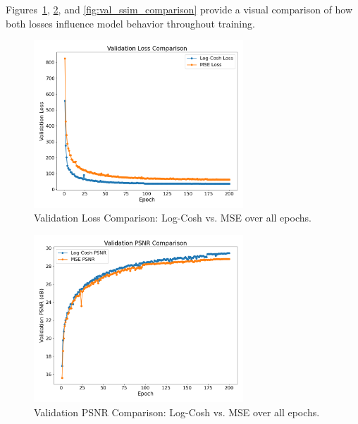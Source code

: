 Figures~\ref{fig:val_loss_comparison}, \ref{fig:val_psnr_comparison}, and \ref{fig:val_ssim_comparison} provide a visual comparison of how both losses influence model behavior throughout training.

\begin{figure}[h]
    \centering
    \includegraphics[width=0.7\textwidth]{img/vae_results/val_loss_comparison.png}
    \caption{Validation Loss Comparison: Log-Cosh vs. MSE over all epochs.}
    \label{fig:val_loss_comparison}
\end{figure}

\begin{figure}[h]
    \centering
    \includegraphics[width=0.7\textwidth]{img/vae_results/val_psnr_comparison.png}
    \caption{Validation PSNR Comparison: Log-Cosh vs. MSE over all epochs.}
    \label{fig:val_psnr_comparison}
\end{figure}

